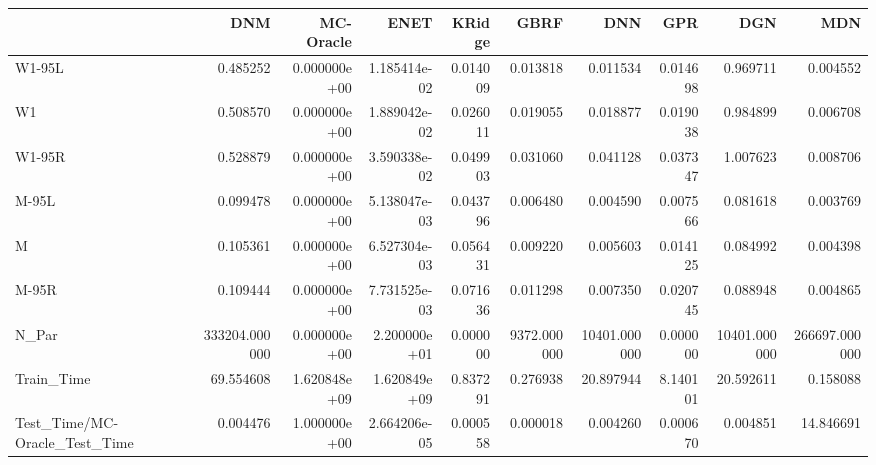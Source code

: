 \begin{tabular}{lrrrrrrrrr}
\toprule
{} &            DNM &     MC-Oracle &          ENET &    KRidge &         GBRF &           DNN &       GPR &           DGN &            MDN \\
\midrule
W1-95L                        &       0.485252 &  0.000000e+00 &  1.185414e-02 &  0.014009 &     0.013818 &      0.011534 &  0.014698 &      0.969711 &       0.004552 \\
W1                            &       0.508570 &  0.000000e+00 &  1.889042e-02 &  0.026011 &     0.019055 &      0.018877 &  0.019038 &      0.984899 &       0.006708 \\
W1-95R                        &       0.528879 &  0.000000e+00 &  3.590338e-02 &  0.049903 &     0.031060 &      0.041128 &  0.037347 &      1.007623 &       0.008706 \\
M-95L                         &       0.099478 &  0.000000e+00 &  5.138047e-03 &  0.043796 &     0.006480 &      0.004590 &  0.007566 &      0.081618 &       0.003769 \\
M                             &       0.105361 &  0.000000e+00 &  6.527304e-03 &  0.056431 &     0.009220 &      0.005603 &  0.014125 &      0.084992 &       0.004398 \\
M-95R                         &       0.109444 &  0.000000e+00 &  7.731525e-03 &  0.071636 &     0.011298 &      0.007350 &  0.020745 &      0.088948 &       0.004865 \\
N\_Par                         &  333204.000000 &  0.000000e+00 &  2.200000e+01 &  0.000000 &  9372.000000 &  10401.000000 &  0.000000 &  10401.000000 &  266697.000000 \\
Train\_Time                    &      69.554608 &  1.620848e+09 &  1.620849e+09 &  0.837291 &     0.276938 &     20.897944 &  8.140101 &     20.592611 &       0.158088 \\
Test\_Time/MC-Oracle\_Test\_Time &       0.004476 &  1.000000e+00 &  2.664206e-05 &  0.000558 &     0.000018 &      0.004260 &  0.000670 &      0.004851 &      14.846691 \\
\bottomrule
\end{tabular}
